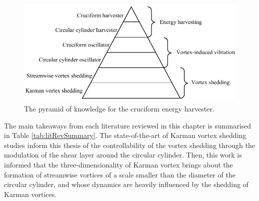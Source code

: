 \documentclass[oneside]{utmthesis}
\begin{document}
\begin{figure}
  \centering
    \includegraphics[width=\textwidth]{figs/pyramidOfKnowledge}
    \caption{The pyramid of knowledge for the cruciform energy harvester.}
    \label{fig:pyramidOfKnowledge}
\end{figure}

The main takeaways from each literature reviewed in this chapter is summarised in Table \ref{tab:litRevSummary}. The state-of-the-art of Karman vortex shedding studies inform this thesis of the controllability of the vortex shedding through the modulation of the shear layer around the circular cylinder. Then, this work is informed that the three-dimensionality of Karman vortex brings about the formation of streamwise vortices of a scale smaller than the diameter of the circular cylinder, and whose dynamics are heavily influenced by the shedding of Karman vortices.
\end{document}
